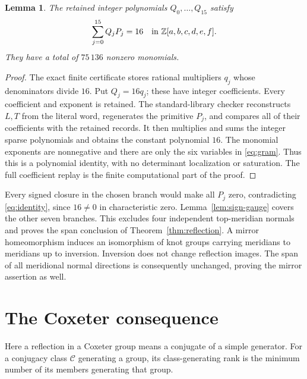 \documentclass[11pt]{article}
\newtheorem{lemma}[theorem]{Lemma}
\begin{document}
\begin{lemma}\label{lem:identity}
The retained integer polynomials $Q_0,\ldots,Q_{15}$ satisfy
\begin{equation}\label{eq:identity}
                   \sum_{j=0}^{15}Q_jP_j=16
             \quad\hbox{in }\mathbb Z[a,b,c,d,e,f].
\end{equation}
They have a total of $75\,136$ nonzero monomials.
\end{lemma}
\begin{proof}
The exact finite certificate stores rational multipliers $q_j$
whose denominators divide $16$. Put $Q_j=16q_j$; these have integer
coefficients. Every coefficient and exponent is retained.
The standard-library checker reconstructs $L,T$ from the literal
word, regenerates the primitive $P_j$, and compares all of their
coefficients with the retained records. It then multiplies and sums
the integer sparse polynomials and obtains the constant polynomial
$16$. The monomial exponents are nonnegative and there are only the
six variables in \eqref{eq:gram}. Thus this is a polynomial identity,
with no determinant localization or saturation. The full coefficient
replay is the finite computational part of the proof.
\end{proof}

Every signed closure in the chosen branch would make all $P_j$
zero, contradicting \eqref{eq:identity}, since $16\ne0$ in characteristic
zero. Lemma~\ref{lem:sign-gauge}
covers the other seven branches. This excludes four independent
top-meridian normals and proves the span conclusion of
Theorem~\ref{thm:reflection}. A mirror homeomorphism induces an
isomorphism of knot groups carrying meridians to meridians up to
inversion. Inversion does not change reflection images. The span of
all meridional normal directions is consequently unchanged, proving
the mirror assertion as well.

\section{The Coxeter consequence}
Here a reflection in a Coxeter group means a conjugate of a simple
generator. For a conjugacy class $\mathcal C$ generating a group,
its class-generating rank is the minimum number of its members
generating that group.
\end{document}
